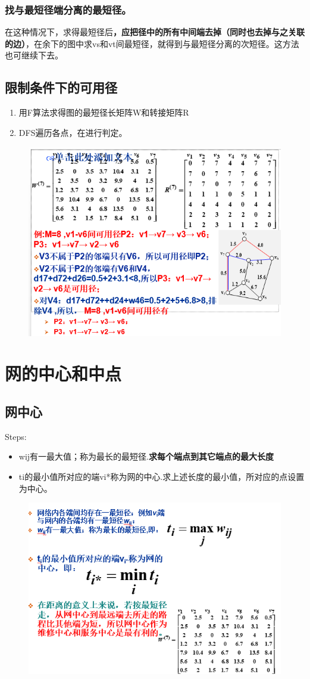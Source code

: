 \subsubsection{找与最短径端分离的最短径。
}
在这种情况下，求得最短径后\textbf{，应把径中的所有中间端去掉（同时也去掉与之关联的边）}，在余下的图中求vs和vt间最短径，就得到与最短径分离的次短径。这方法也可继续下去。
\subsection{限制条件下的可用径}
\begin{enumerate}
	\item 用F算法求得图的最短径长矩阵W和转接矩阵R
	\item DFS遍历各点，在进行判定。
\end{enumerate}
\begin{figure}[H]
	\centering
	\includegraphics[width=0.7\linewidth]{figures/screenshot073}
	\caption{}
	\label{fig:screenshot073}
\end{figure}
\section{网的中心和中点}
\subsection{网中心}
Steps:
\begin{itemize}
	\item wij有一最大值；称为最长的最短径.\textbf{求每个端点到其它端点的最大长度}
	\item ti的最小值所对应的端vi*称为网的中心.求上述长度的最小值，所对应的点设置为中心。
\end{itemize}
\begin{figure}[H]
	\centering
	\includegraphics[width=0.7\linewidth]{figures/screenshot074}
	\caption{}
	\label{fig:screenshot074}
\end{figure}
